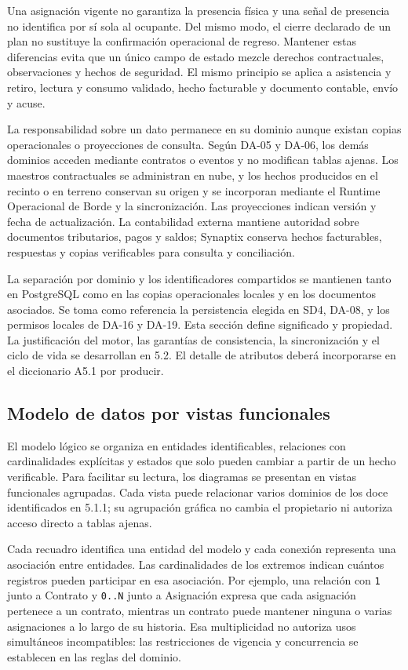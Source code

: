 Una asignación vigente no garantiza la presencia física y una señal de presencia no identifica por sí sola al ocupante. Del mismo modo, el cierre declarado de un plan no sustituye la confirmación operacional de regreso. Mantener estas diferencias evita que un único campo de estado mezcle derechos contractuales, observaciones y hechos de seguridad. El mismo principio se aplica a asistencia y retiro, lectura y consumo validado, hecho facturable y documento contable, envío y acuse.

La responsabilidad sobre un dato permanece en su dominio aunque existan copias operacionales o proyecciones de consulta. Según DA-05 y DA-06, los demás dominios acceden mediante contratos o eventos y no modifican tablas ajenas. Los maestros contractuales se administran en nube, y los hechos producidos en el recinto o en terreno conservan su origen y se incorporan mediante el Runtime Operacional de Borde y la sincronización. Las proyecciones indican versión y fecha de actualización. La contabilidad externa mantiene autoridad sobre documentos tributarios, pagos y saldos; Synaptix conserva hechos facturables, respuestas y copias verificables para consulta y conciliación.

La separación por dominio y los identificadores compartidos se mantienen tanto en PostgreSQL como en las copias operacionales locales y en los documentos asociados. Se toma como referencia la persistencia elegida en SD4, DA-08, y los permisos locales de DA-16 y DA-19. Esta sección define significado y propiedad. La justificación del motor, las garantías de consistencia, la sincronización y el ciclo de vida se desarrollan en 5.2. El detalle de atributos deberá incorporarse en el diccionario A5.1 por producir.


\subsection{Modelo de datos por vistas funcionales} %
El modelo lógico se organiza en entidades identificables, relaciones con cardinalidades explícitas y estados que solo pueden cambiar a partir de un hecho verificable. Para facilitar su lectura, los diagramas se presentan en vistas funcionales agrupadas. Cada vista puede relacionar varios dominios de los doce identificados en 5.1.1; su agrupación gráfica no cambia el propietario ni autoriza acceso directo a tablas ajenas.

Cada recuadro identifica una entidad del modelo y cada conexión representa una asociación entre entidades. Las cardinalidades de los extremos indican cuántos registros pueden participar en esa asociación. Por ejemplo, una relación con \texttt{1} junto a Contrato y \texttt{0..N} junto a Asignación expresa que cada asignación pertenece a un contrato, mientras un contrato puede mantener ninguna o varias asignaciones a lo largo de su historia. Esa multiplicidad no autoriza usos simultáneos incompatibles: las restricciones de vigencia y concurrencia se establecen en las reglas del dominio.

